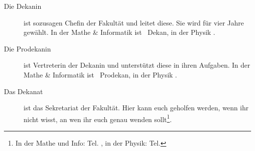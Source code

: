 \begin{description}
%
%
%
%
%
%
%

\item[Die Dekanin] ist sozusagen Chefin der Fakultät und leitet diese. Sie wird für vier Jahre gewählt. In der Mathe \& Informatik ist \dekanmathelang\ Dekan, in der Physik \dekanphysiklang .

\item[Die Prodekanin] ist Vertreterin der Dekanin und unterstützt diese in ihren Aufgaben. In der Mathe \& Informatik ist \prodekanmathe\ Prodekan, in der Physik \prodekanphysik .\\[2em]

\item[Das Dekanat] ist das Sekretariat der Fakultät. Hier kann euch geholfen werden, wenn ihr nicht wisst, an wen ihr euch genau wenden sollt\footnote{In der Mathe und Info: Tel.  \dekanatmathetelefon , in der Physik: Tel. \dekanatphysiktelefon}.


\end{description}
